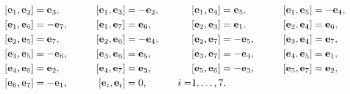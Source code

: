 \begin{alignat*}{4}


&[\bold{e}_{1},\bold{e}_{2}]=\bold{e}_{3}, &\qquad


[\bold{e}_{1},\bold{e}_{3}]&=-\bold{e}_{2}, &\quad


&[\bold{e}_{1},\bold{e}_{4}]=\bold{e}_{5}, &\qquad


&[\bold{e}_{1},\bold{e}_{5}]=-\bold{e}_{4}, \\


%


&[\bold{e}_{1},\bold{e}_{6}]=-\bold{e}_{7}, &\qquad


[\bold{e}_{1},\bold{e}_{7}]&=\bold{e}_{6}, &\quad


&[\bold{e}_{2},\bold{e}_{3}]=\bold{e}_{1}, &\qquad


&[\bold{e}_{2},\bold{e}_{4}]=\bold{e}_{6}, \\


%


&[\bold{e}_{2},\bold{e}_{5}]=\bold{e}_{7}, &\qquad


[\bold{e}_{2},\bold{e}_{6}]&=-\bold{e}_{4}, &\quad


&[\bold{e}_{2},\bold{e}_{7}]=-\bold{e}_{5}, &\qquad


&[\bold{e}_{3},\bold{e}_{4}]=\bold{e}_{7}, \\


%


&[\bold{e}_{3},\bold{e}_{5}]=-\bold{e}_{6}, &\qquad


[\bold{e}_{3},\bold{e}_{6}]&=\bold{e}_{5}, &\quad


&[\bold{e}_{3},\bold{e}_{7}]=-\bold{e}_{4}, &\qquad


&[\bold{e}_{4},\bold{e}_{5}]=\bold{e}_{1}, \\


%


&[\bold{e}_{4},\bold{e}_{6}]=\bold{e}_{2}, &\qquad


[\bold{e}_{4},\bold{e}_{7}]&=\bold{e}_{3}, &\quad


&[\bold{e}_{5},\bold{e}_{6}]=-\bold{e}_{3}, &\qquad


&[\bold{e}_{5},\bold{e}_{7}]=\bold{e}_{2}, \\


%


&[\bold{e}_{6},\bold{e}_{7}]=-\bold{e}_{1}, &\qquad


[\bold{e}_{i},\bold{e}_{i}]&=0, &\quad i=&1,\dotsc,7. & \ & \


\end{alignat*}


